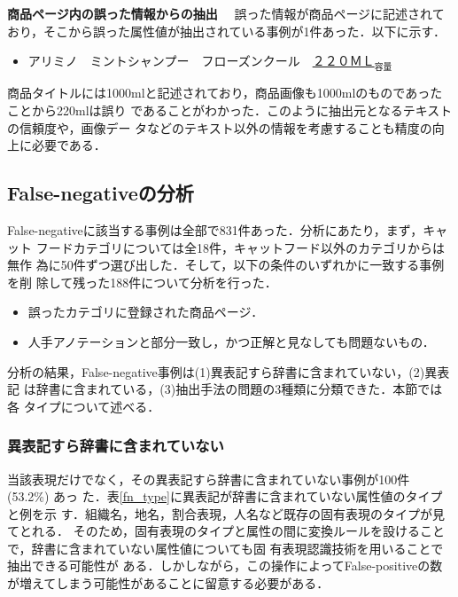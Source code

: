 \documentclass[japanese]{jnlp_1.4}
\begin{document}
\vspace{1\Cvs}
\noindent
\textbf{商品ページ内の誤った情報からの抽出}　
誤った情報が商品ページに記述されており，そこから誤った属性値が抽出されている事例が1件あった．以下に示す．

\begin{itemize}
\item アリミノ　ミントシャンプー　フローズンクール　\underline{２２０ＭＬ}$_{容量}$
\end{itemize}

\noindent
商品タイトルには1000mlと記述されており，商品画像も1000mlのものであったことから220mlは誤り
であることがわかった．このように抽出元となるテキストの信頼度や，画像デー
タなどのテキスト以外の情報を考慮することも精度の向上に必要である．



\subsection{False-negativeの分析}

False-negativeに該当する事例は全部で831件あった．分析にあたり，まず，キャット
フードカテゴリについては全18件，キャットフード以外のカテゴリからは無作
為に50件ずつ選び出した．そして，以下の条件のいずれかに一致する事例を削
除して残った188件について分析を行った．

\begin{itemize}
\item 誤ったカテゴリに登録された商品ページ．
\item 人手アノテーションと部分一致し，かつ正解と見なしても問題ないもの．
\end{itemize}

\noindent
分析の結果，False-negative事例は(1)異表記すら辞書に含まれていない，(2)異表記
は辞書に含まれている，(3)抽出手法の問題の3種類に分類できた．本節では各
タイプについて述べる．


\subsubsection{異表記すら辞書に含まれていない}
\label{notContainedSpellingVariation}

当該表現だけでなく，その異表記すら辞書に含まれていない事例が100件 (53.2\%) あっ
た．表\ref{fn_type}に異表記が辞書に含まれていない属性値のタイプと例を示
す．組織名，地名，割合表現，人名など既存の固有表現のタイプが見てとれる．
そのため，固有表現のタイプと属性の間に変換ルールを設けることで，辞書に含まれていない属性値についても固
有表現認識技術を用いることで抽出できる可能性が
ある．しかしながら，この操作によってFalse-positiveの数が増えてしまう可能性があることに留意する必要がある．
\end{document}
